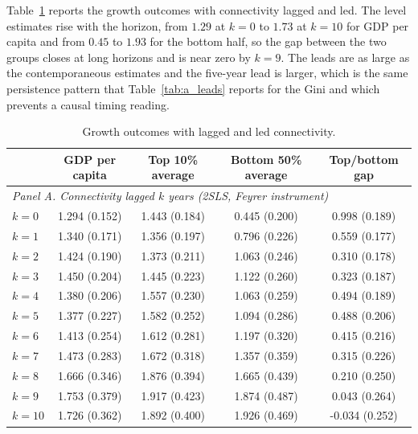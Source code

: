 Table~\ref{tab:a_growth_hzn} reports the growth outcomes with connectivity lagged and led. The level estimates rise with the horizon, from $1.29$ at $k=0$ to $1.73$ at $k=10$ for GDP per capita and from $0.45$ to $1.93$ for the bottom half, so the gap between the two groups closes at long horizons and is near zero by $k=9$. The leads are as large as the contemporaneous estimates and the five-year lead is larger, which is the same persistence pattern that Table~\ref{tab:a_leads} reports for the Gini and which prevents a causal timing reading.

\begin{table}[H]\centering\caption{Growth outcomes with lagged and led connectivity.}\label{tab:a_growth_hzn}
\begin{threeparttable}\small\begin{tabular}{lcccc}
\toprule
 & GDP per capita & Top 10\% average & Bottom 50\% average & Top/bottom gap \\
\midrule
\multicolumn{5}{l}{\emph{Panel A. Connectivity lagged $k$ years (2SLS, Feyrer instrument)}}\\
$k=0$ & 1.294\sym{***} (0.152) & 1.443\sym{***} (0.184) & 0.445\sym{**} (0.200) & 0.998\sym{***} (0.189) \\
$k=1$ & 1.340\sym{***} (0.171) & 1.356\sym{***} (0.197) & 0.796\sym{***} (0.226) & 0.559\sym{***} (0.177) \\
$k=2$ & 1.424\sym{***} (0.190) & 1.373\sym{***} (0.211) & 1.063\sym{***} (0.246) & 0.310\sym{*} (0.178) \\
$k=3$ & 1.450\sym{***} (0.204) & 1.445\sym{***} (0.223) & 1.122\sym{***} (0.260) & 0.323\sym{*} (0.187) \\
$k=4$ & 1.380\sym{***} (0.206) & 1.557\sym{***} (0.230) & 1.063\sym{***} (0.259) & 0.494\sym{***} (0.189) \\
$k=5$ & 1.377\sym{***} (0.227) & 1.582\sym{***} (0.252) & 1.094\sym{***} (0.286) & 0.488\sym{**} (0.206) \\
$k=6$ & 1.413\sym{***} (0.254) & 1.612\sym{***} (0.281) & 1.197\sym{***} (0.320) & 0.415\sym{*} (0.216) \\
$k=7$ & 1.473\sym{***} (0.283) & 1.672\sym{***} (0.318) & 1.357\sym{***} (0.359) & 0.315 (0.226) \\
$k=8$ & 1.666\sym{***} (0.346) & 1.876\sym{***} (0.394) & 1.665\sym{***} (0.439) & 0.210 (0.250) \\
$k=9$ & 1.753\sym{***} (0.379) & 1.917\sym{***} (0.423) & 1.874\sym{***} (0.487) & 0.043 (0.264) \\
$k=10$ & 1.726\sym{***} (0.362) & 1.892\sym{***} (0.400) & 1.926\sym{***} (0.469) & -0.034 (0.252) \\

\end{tabular}
\end{threeparttable}
\end{table}
